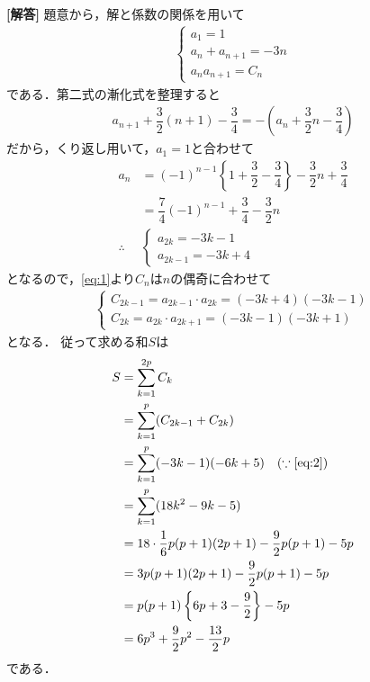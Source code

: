 \documentclass[../../main.tex]{subfiles}
\begin{document}
\begin{oframed}
  
\end{oframed}

{\bf [解答]}
題意から，解と係数の関係を用いて
\begin{align}
  \begin{cases}
    a_1=1 \\
    a_n+a_{n+1}=-3n \\
    a_na_{n+1}=C_n
  \end{cases} \label{eq:1}
\end{align}
である．第二式の漸化式を整理すると
\begin{align}
  a_{n+1}+\dfrac{3}{2}(n+1)-\dfrac{3}{4}=-\left(a_n+\dfrac{3}{2}n-\dfrac{3}{4}\right)
\end{align}
だから，くり返し用いて，$a_1 = 1$と合わせて
\begin{align}
  a_n
  &=(-1)^{n-1}\left\{1+\dfrac{3}{2}-\dfrac{3}{4}\right\}-\dfrac{3}{2}n+\dfrac{3}{4} \\
  &= \dfrac{7}{4}(-1)^{n-1}+\dfrac{3}{4}-\dfrac{3}{2}n \\
  \therefore\
  &
  \begin{cases}
    a_{2k}=-3k-1 \\
    a_{2k-1}=-3k+4
  \end{cases}
\end{align}
となるので，\cref{eq:1}より$C_n$は$n$の偶奇に合わせて
\begin{align}
  \begin{cases}
    C_{2k-1}=a_{2k-1}\cdot a_{2k}=(-3k+4)(-3k-1) \\
    C_{2k}=a_{2k}\cdot a_{2k+1}=(-3k-1)(-3k+1)
  \end{cases} \label{eq:2}
\end{align}
となる．
従って求める和$S$は
\begin{align}
  S
  &=\sum_{k=1}^{2p}C_k \\
  &=\sum_{k=1}^{p}(C_{2k-1}+C_{2k}) \\
  &= \sum_{k=1}^{p}(-3k-1)(-6k+5) \quad (\because\text{\cref{eq:2}}) \\
  &= \sum_{k=1}^{p}(18k^2-9k-5) \\
  &=18\cdot\dfrac{1}{6} p(p+1)(2p+1)-\dfrac{9}{2}p(p+1)-5p \\
  &= 3p(p+1)(2p+1)-\dfrac{9}{2}p(p+1)-5p \\
  &= p(p+1)\left\{6p+3-\dfrac{9}{2}\right\}-5p \\
  &= 6p^3+\dfrac{9}{2}p^2-\dfrac{13}{2}p
\end{align}
である．

\newpage
\end{document}
